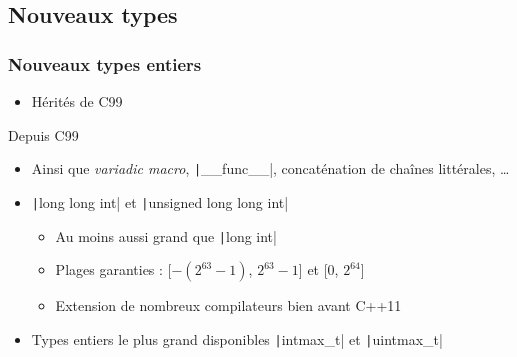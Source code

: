 \documentclass[C++.tex]{subfiles}
\begin{document}
\subsection*{Nouveaux types}
\begin{frame}[fragile]
	\frametitle{Nouveaux types entiers}
	\begin{itemize}
		\item Hérités de C99
	\end{itemize}

	\begin{block}{Depuis C99}
		\begin{itemize}
			\item Ainsi que \textit{variadic macro}, \texttt|__func__|, concaténation de chaînes littérales, \ldots{}
		\end{itemize}
	\end{block}

	\begin{itemize}
		\item \texttt|long long int| et \texttt|unsigned long long int|
		\begin{itemize}
			\item Au moins aussi grand que \texttt|long int|
			\item Plages garanties : [$-(2^{63}-1)$, $2^{63}-1$] et [$0$, $2^{64}$]
			\item Extension de nombreux compilateurs bien avant C++11
		\end{itemize}
		\item Types entiers le plus grand disponibles \texttt|intmax_t| et \texttt|uintmax_t|
	\end{itemize}
\end{frame}
\end{document}
